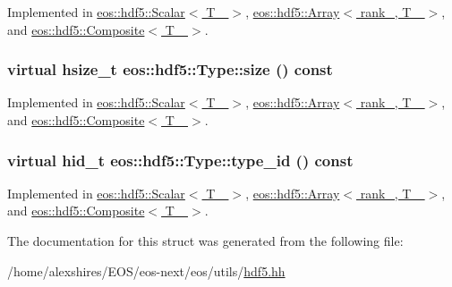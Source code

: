 Implemented in \hyperlink{classeos_1_1hdf5_1_1Scalar_af914b3bd28aa664d17cc6223659c7b45}{eos::hdf5::Scalar$<$ T\_\- $>$}, \hyperlink{classeos_1_1hdf5_1_1Array_aa533ea361fe7d7f589ea60ffee2120a5}{eos::hdf5::Array$<$ rank\_\-, T\_\- $>$}, and \hyperlink{classeos_1_1hdf5_1_1Composite_aa72cd90613270fa5006319bee231be5b}{eos::hdf5::Composite$<$ T\_\- $>$}.\hypertarget{structeos_1_1hdf5_1_1Type_a0cf79b090412bb228a1df8349acf3c2b}{
\subsubsection[{size}]{\setlength{\rightskip}{0pt plus 5cm}virtual hsize\_\-t eos::hdf5::Type::size () const}}
\label{structeos_1_1hdf5_1_1Type_a0cf79b090412bb228a1df8349acf3c2b}


Implemented in \hyperlink{classeos_1_1hdf5_1_1Scalar_a88e62fcc7557957b737a45a9f6ac7952}{eos::hdf5::Scalar$<$ T\_\- $>$}, \hyperlink{classeos_1_1hdf5_1_1Array_abbe03946de83c9b63d6fc35fc5a60c69}{eos::hdf5::Array$<$ rank\_\-, T\_\- $>$}, and \hyperlink{classeos_1_1hdf5_1_1Composite_a67ce4870971aced7cf83a7a88c16c61d}{eos::hdf5::Composite$<$ T\_\- $>$}.\hypertarget{structeos_1_1hdf5_1_1Type_a0305c470a7a26a391f9a751e40bb9ff6}{
\subsubsection[{type\_\-id}]{\setlength{\rightskip}{0pt plus 5cm}virtual {\bf hid\_\-t} eos::hdf5::Type::type\_\-id () const}}
\label{structeos_1_1hdf5_1_1Type_a0305c470a7a26a391f9a751e40bb9ff6}


Implemented in \hyperlink{classeos_1_1hdf5_1_1Scalar_a5d54b43030237b9bc1c7076184ff968d}{eos::hdf5::Scalar$<$ T\_\- $>$}, \hyperlink{classeos_1_1hdf5_1_1Array_ac560c57df5f551234fd5ac77d1890d30}{eos::hdf5::Array$<$ rank\_\-, T\_\- $>$}, and \hyperlink{classeos_1_1hdf5_1_1Composite_a97743d3126f849b6359587508b488a38}{eos::hdf5::Composite$<$ T\_\- $>$}.

The documentation for this struct was generated from the following file:\begin{DoxyCompactItemize}
\item 
/home/alexshires/EOS/eos-\/next/eos/utils/\hyperlink{hdf5_8hh}{hdf5.hh}\end{DoxyCompactItemize}
